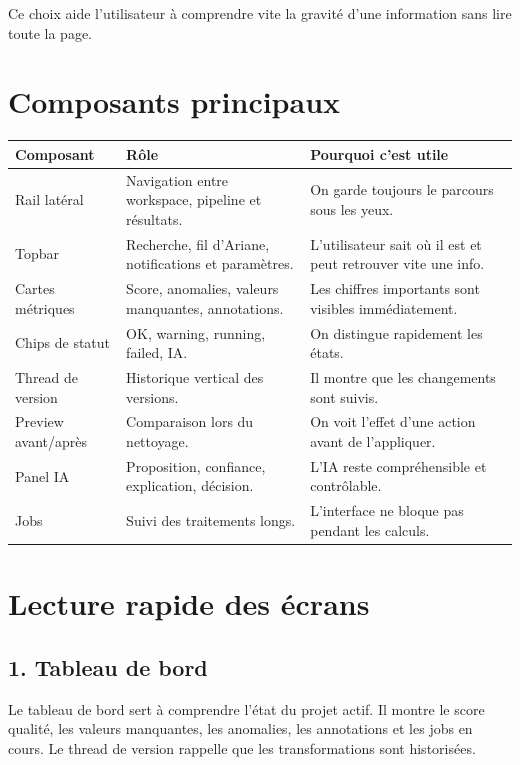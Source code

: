 \documentclass[10pt,a4paper]{article}
\begin{document}
Ce choix aide l'utilisateur \`a comprendre vite la gravit\'e d'une information sans lire toute la page.

\section{Composants principaux}

\begin{tabular}{|p{}|p{}|p{}|}
\hline
\textbf{Composant} & \textbf{R\^ole} & \textbf{Pourquoi c'est utile} \\
\hline
Rail lat\'eral & Navigation entre workspace, pipeline et r\'esultats. & On garde toujours le parcours sous les yeux. \\
\hline
Topbar & Recherche, fil d'Ariane, notifications et param\`etres. & L'utilisateur sait o\`u il est et peut retrouver vite une info. \\
\hline
Cartes m\'etriques & Score, anomalies, valeurs manquantes, annotations. & Les chiffres importants sont visibles imm\'ediatement. \\
\hline
Chips de statut & OK, warning, running, failed, IA. & On distingue rapidement les \'etats. \\
\hline
Thread de version & Historique vertical des versions. & Il montre que les changements sont suivis. \\
\hline
Preview avant/apr\`es & Comparaison lors du nettoyage. & On voit l'effet d'une action avant de l'appliquer. \\
\hline
Panel IA & Proposition, confiance, explication, d\'ecision. & L'IA reste compr\'ehensible et contr\^olable. \\
\hline
Jobs & Suivi des traitements longs. & L'interface ne bloque pas pendant les calculs. \\
\hline
\end{tabular}

\section{Lecture rapide des \'ecrans}

\subsection{1. Tableau de bord}

Le tableau de bord sert \`a comprendre l'\'etat du projet actif. Il montre le score qualit\'e, les valeurs manquantes, les anomalies, les annotations et les jobs en cours. Le thread de version rappelle que les transformations sont historis\'ees.
\end{document}
